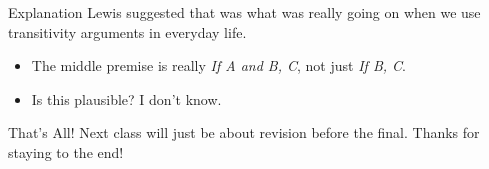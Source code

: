 \documentclass[
  ignorenonframetext,
]{beamer}
\providecommand{\tightlist}{%
  \setlength{\itemsep}{0pt}\setlength{\parskip}{0pt}}
\renewcommand{\,}{\text{, }}
\begin{document}
\begin{frame}{Explanation}
\protect\hypertarget{explanation}{}
Lewis suggested that was what was really going on when we use
transitivity arguments in everyday life.

\begin{itemize}
\tightlist
\item
  The middle premise is really \emph{If A and B, C}, not just \emph{If
  B, C}.
\item
  Is this plausible? I don't know.
\end{itemize}
\end{frame}

\begin{frame}{That's All!}
\protect\hypertarget{thats-all}{}
Next class will just be about revision before the final. Thanks for
staying to the end!
\end{frame}
\end{document}
